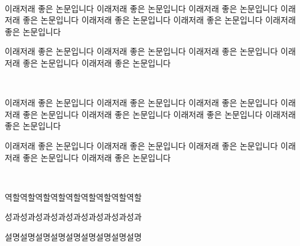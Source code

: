 \documentclass[a4paper]{MagicalCV}
\begin{document}
\begin{minipage}[t]{0.66\textwidth} 


 \\
\vspace{\topsep} %
\begin{tightemize}

\item 이래저래 좋은 논문입니다 이래저래 좋은 논문입니다 이래저래 좋은 논문입니다 이래저래 좋은 논문입니다 이래저래 좋은 논문입니다 이래저래 좋은 논문입니다 이래저래 좋은 논문입니다 

\item 이래저래 좋은 논문입니다 이래저래 좋은 논문입니다 이래저래 좋은 논문입니다 이래저래 좋은 논문입니다 이래저래 좋은 논문입니다
\end{tightemize}
\sectionsep

 \\
\vspace{\topsep} %
\begin{tightemize}

\item 이래저래 좋은 논문입니다 이래저래 좋은 논문입니다 이래저래 좋은 논문입니다 이래저래 좋은 논문입니다 이래저래 좋은 논문입니다 이래저래 좋은 논문입니다 이래저래 좋은 논문입니다 

\item 이래저래 좋은 논문입니다 이래저래 좋은 논문입니다 이래저래 좋은 논문입니다 이래저래 좋은 논문입니다 이래저래 좋은 논문입니다 

\end{tightemize}
\sectionsep


 \\
\vspace{\topsep} %
\begin{tightemize}
\item 역할역할역할역할역할역할역할역할역할
\item 성과성과성과성과성과성과성과성과성과
\item 설명설명설명설명설명설명설명설명설명
\end{tightemize}
\sectionsep


\end{minipage}
\end{document}
